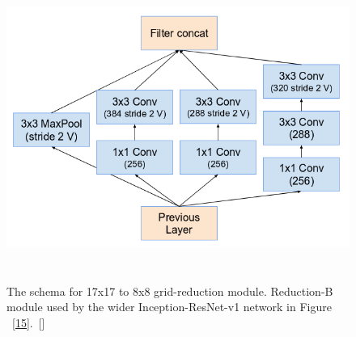 \documentclass[a4paper,12pt, twoside]{NITKReport}
\begin{document}
 \begin{figure}[h]
\centering
    \includegraphics[height=10cm,width=13cm]{figure18.png}
    \caption{ The schema for 17x17 to 8x8 grid-reduction module. Reduction-B module used by the wider Inception-ResNet-v1 network in Figure ~\ref{15}.~[\cite{szegedy2017inception}]}
    \label{18}
 
\end{figure}
\end{document}
